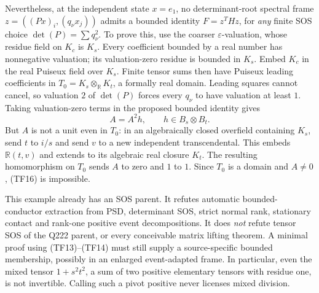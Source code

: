 Nevertheless, at the independent state $x=e_1$, no determinant-root
spectral frame $z=((Px)_i,(q_\nu x_j))$ admits a bounded identity
$F=z^THz$, for \emph{any} finite SOS choice $\det(P)=\sum q_\nu^2$.
To prove this, use the coarser $\varepsilon$-valuation, whose residue
field on $K_c$ is $K_s$. Every coefficient bounded by a real number
has nonnegative valuation; its valuation-zero residue is bounded
in $K_s$. Embed $K_c$ in the real Puiseux field over $K_s$.
Finite tensor sums then have Puiseux leading coefficients in
$T_0=K_s\otimes_{\mathbb R}K_t$, a formally real domain.
Leading squares cannot cancel, so valuation $2$ of $\det(P)$
forces every $q_\nu$ to have valuation at least $1$.
Taking valuation-zero terms in the proposed bounded identity gives
\[
                  A=A^2h,\qquad h\in B_s\otimes B_t. \tag{TF16}
\]
But $A$ is not a unit even in $T_0$: in an algebraically closed
overfield containing $K_s$, send $t$ to $i/s$ and send $v$ to a
new independent transcendental. This embeds $\mathbb R(t,v)$
and extends to its algebraic real closure $K_t$. The resulting
homomorphism on $T_0$ sends $A$ to zero and $1$ to $1$.
Since $T_0$ is a domain and $A\ne0$, (TF16) is impossible.

This example already has an SOS parent. It refutes automatic
bounded-conductor extraction from PSD, determinant SOS, strict
normal rank, stationary contact and rank-one positive event
decompositions. It does \emph{not} refute tensor SOS of the Q222
parent, or every conceivable matrix lifting theorem. A minimal
proof using (TF13)--(TF14) must still supply a source-specific
bounded membership, possibly in an enlarged event-adapted frame.
In particular, even the mixed tensor $1+s^2t^2$, a sum of two
positive elementary tensors with residue one, is not invertible.
Calling such a pivot positive never licenses mixed division.
